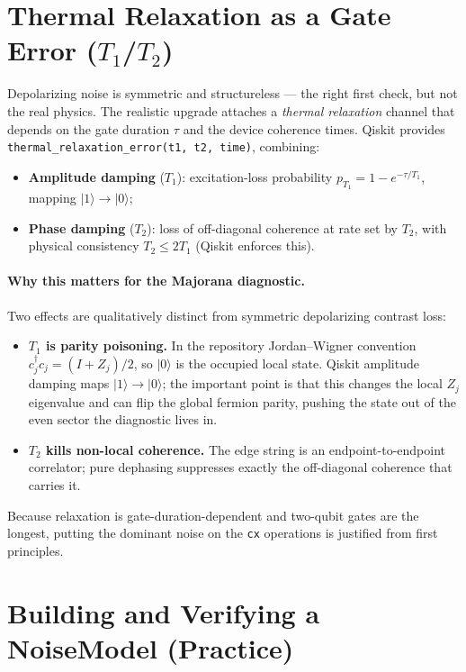 \documentclass[11pt]{article}
\newcommand{\ket}[1]{|#1\rangle}
\begin{document}
\section{Thermal Relaxation as a Gate Error ($T_1$/$T_2$)}

Depolarizing noise is symmetric and structureless --- the right first check, but not the real physics. The realistic upgrade attaches a \emph{thermal relaxation} channel that depends on the gate duration $\tau$ and the device coherence times. Qiskit provides \texttt{thermal\_relaxation\_error(t1, t2, time)}, combining:
\begin{itemize}
  \item \textbf{Amplitude damping} ($T_1$): excitation-loss probability $p_{T_1}=1-e^{-\tau/T_1}$, mapping $\ket{1}\to\ket{0}$;
  \item \textbf{Phase damping} ($T_2$): loss of off-diagonal coherence at rate set by $T_2$, with physical consistency $T_2\le 2T_1$ (Qiskit enforces this).
\end{itemize}

\paragraph{Why this matters for the Majorana diagnostic.} Two effects are qualitatively distinct from symmetric depolarizing contrast loss:
\begin{itemize}
  \item \textbf{$T_1$ is parity poisoning.} In the repository Jordan--Wigner convention $c_j^\dagger c_j=(I+Z_j)/2$, so $\ket0$ is the occupied local state. Qiskit amplitude damping maps $\ket1\to\ket0$; the important point is that this changes the local $Z_j$ eigenvalue and can flip the global fermion parity, pushing the state out of the even sector the diagnostic lives in.
  \item \textbf{$T_2$ kills non-local coherence.} The edge string is an endpoint-to-endpoint correlator; pure dephasing suppresses exactly the off-diagonal coherence that carries it.
\end{itemize}
Because relaxation is gate-duration-dependent and two-qubit gates are the longest, putting the dominant noise on the \texttt{cx} operations is justified from first principles.

\section{Building and Verifying a NoiseModel (Practice)}
\end{document}
